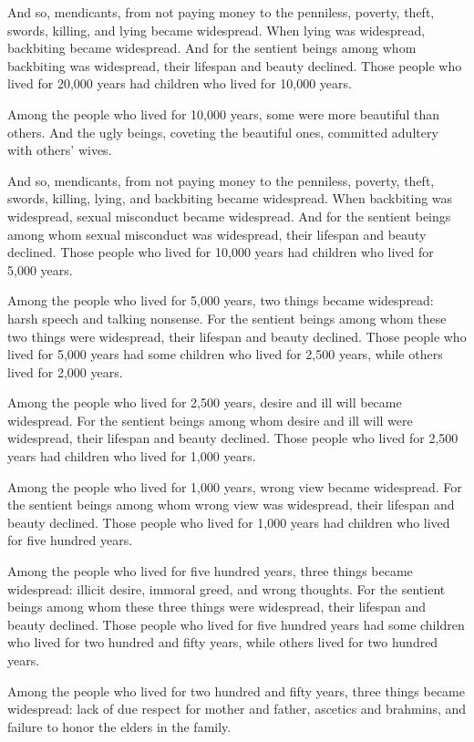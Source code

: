 \documentclass[12pt,openany]{book}%
\begin{document}
And so, mendicants, from not paying money to the penniless, poverty, theft, swords, killing, and lying became widespread. When lying was widespread, backbiting became widespread. And for the sentient beings among whom backbiting was widespread, their lifespan and beauty declined. Those people who lived for 20,000 years had children who lived for 10,000 years. 

Among the people who lived for 10,000 years, some were more beautiful than others. And the ugly beings, coveting the beautiful ones, committed adultery with others’ wives. 

And so, mendicants, from not paying money to the penniless, poverty, theft, swords, killing, lying, and backbiting became widespread. When backbiting was widespread, sexual misconduct became widespread. And for the sentient beings among whom sexual misconduct was widespread, their lifespan and beauty declined. Those people who lived for 10,000 years had children who lived for 5,000 years. 

Among the people who lived for 5,000 years, two things became widespread: harsh speech and talking nonsense. For the sentient beings among whom these two things were widespread, their lifespan and beauty declined. Those people who lived for 5,000 years had some children who lived for 2,500 years, while others lived for 2,000 years. 

Among the people who lived for 2,500 years, desire and ill will became widespread. For the sentient beings among whom desire and ill will were widespread, their lifespan and beauty declined. Those people who lived for 2,500 years had children who lived for 1,000 years. 

Among the people who lived for 1,000 years, wrong view became widespread. For the sentient beings among whom wrong view was widespread, their lifespan and beauty declined. Those people who lived for 1,000 years had children who lived for five hundred years. 

Among the people who lived for five hundred years, three things became widespread: illicit desire, immoral greed, and wrong thoughts. For the sentient beings among whom these three things were widespread, their lifespan and beauty declined. Those people who lived for five hundred years had some children who lived for two hundred and fifty years, while others lived for two hundred years. 

Among the people who lived for two hundred and fifty years, three things became widespread: lack of due respect for mother and father, ascetics and brahmins, and failure to honor the elders in the family. 
\end{document}
